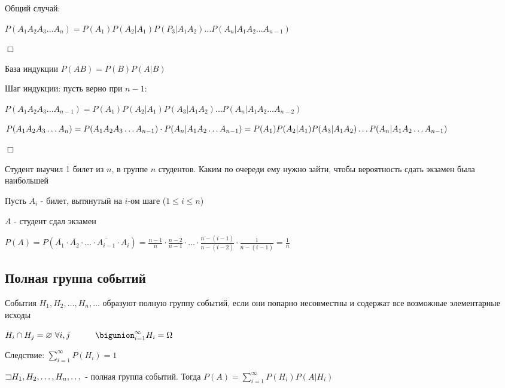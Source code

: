 \documentclass[12pt]{article}
\begin{document}
    Общий случай:

    $P(A_1 A_2 A_3 \dots A_n) = P(A_1) P(A_2 | A_1) P(P_3 | A_1 A_2) \dots P(A_n | A_1 A_2 \dots A_{n - 1})$

    \begin{tcolorbox}
        $\Box$

        База индукции $P(AB) = P(B) P(A|B)$

        Шаг индукции: пусть верно при $n - 1$:

        $P(A_1 A_2 A_3 \dots A_{n - 1}) = P(A_1) P(A_2 | A_1) P(A_3 | A_1 A_2) \dots P(A_n | A_1 A_2 \dots A_{n - 2})$

        $P(A_1 A_2 A_3 \dots A_n) = P(A_1 A_2 A_3 \dots A_{n - 1}) \cdot P(A_n | A_1 A_2 \dots A_{n - 1}) = \\
        P(A_1) P(A_2 | A_1) P(A_3 | A_1 A_2) \dots P(A_n | A_1 A_2 \dots A_{n - 1})$

        $\Box$
    \end{tcolorbox}


    \Ex Студент выучил 1 билет из $n$, в группе $n$ студентов. Каким по очереди ему нужно зайти, чтобы вероятность сдать экзамен была наибольшей

    Пусть $A_i$ - билет, вытянутый на $i$-ом шаге ($1 \leq i \leq n$)

    $A$ - студент сдал экзамен

    $P(A) = P(\overline{A_1} \cdot \overline{A_2} \cdot \dots \cdot \overline{A_{i - 1}} \cdot A_i) = \frac{n - 1}{n} \cdot \frac{n - 2}{n - 1} \cdot \dots \cdot \frac{n - (i - 1)}{n - (i - 2)} \cdot \frac{1}{n - (i - 1)} = \frac{1}{n}$

    \hypertarget{completegroupofevents}{}

    \subsection{Полная группа событий}

    \Def События $H_1, H_2, \dots, H_n, \dots$ образуют полную группу событий, если они попарно несовместны и содержат все возможные элементарные исходы

    $H_i \cap H_j = \emptyset \ \forall i, j \quad\quad\quad \bigunion_{i = 1}^{\infty} H_i = \Omega$

    Следствие: $\sum_{i = 1}^\infty P(H_i) = 1$

    \hypertarget{formulaofcompleteprobability}{}

    \begin{MyTheorem}
         $\mathord{\sqsupset} H_1, H_2, \dots, H_n, \dots$ - полная группа событий. Тогда $P(A) = \sum_{i = 1}^\infty P(H_i) P(A | H_i)$
    \end{MyTheorem}
\end{document}

